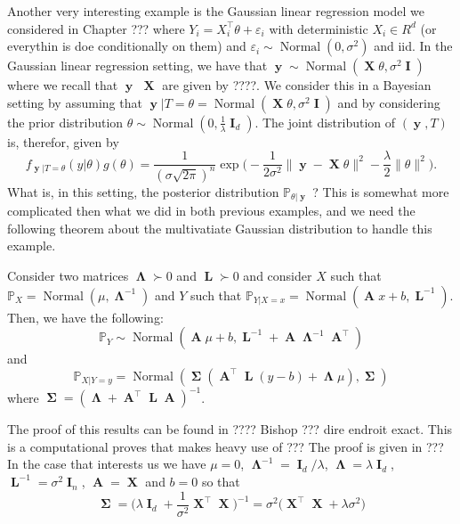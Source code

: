 \documentclass[
	fontsize=11pt, %
	twoside=false, %
	numbers=noenddot, %
]{kaobook}
\DeclareMathOperator{\bA}{{\boldsymbol A}}
\DeclareMathOperator{\bI}{{\boldsymbol I}}
\DeclareMathOperator{\bL}{{\boldsymbol L}}
\DeclareMathOperator{\bX}{{\boldsymbol X}}
\DeclareMathOperator{\by}{{\boldsymbol y}}
\DeclareMathOperator{\bLambda}{{\boldsymbol \Lambda}}
\DeclareMathOperator{\bSigma}{\boldsymbol \Sigma}
\DeclareMathOperator{\nor}{Normal}
\newcommand{\eps}{\varepsilon}
\renewcommand{\P}{\mathbb P}
\newcommand{\norm}[1]{\| #1 \|}
\begin{document}
Another very interesting example is the Gaussian linear regression model we considered in Chapter ??? where
$Y_i = X_i^\top \theta + \eps_i$ with deterministic $X_i \in R^d$ (or everythin is doe conditionally on them) and $\eps_i \sim \nor(0, \sigma^2)$ and iid.
In the Gaussian linear regression setting, we have that $\by \sim \nor(\bX \theta, \sigma^2 \bI)$ where we recall that $\by$ $\bX$ are given by ????.
We consider this in a Bayesian setting by assuming that $\by | T = \theta = \nor(\bX \theta, \sigma^2 \bI)$ and by considering the prior distribution $\theta \sim \nor(0, \frac{1}{\lambda} \bI_d)$.
The joint distribution of $(\by, T)$ is, therefor, given by
\begin{equation*}
	f_{\by | T = \theta}(y | \theta) g(\theta) = \frac{1}{(\sigma \sqrt{2 \pi})^{n}} 
	\exp \Big( -\frac{1}{2 \sigma^2} \norm{\by - \bX \theta}^2 - \frac {\lambda}{2} \norm{\theta}^2 \Big).
\end{equation*}
What is, in this setting, the posterior distribution $\P_{\theta | \by}$ ?
This is somewhat more complicated then what we did in both previous examples, and we need the following theorem about the multivatiate Gaussian distribution to handle this example.
\begin{theorem}
	Consider two matrices $\bLambda \succ 0$ and $\bL \succ 0$ and consider 
	$X$ such that $\P_X = \nor(\mu, \bLambda^{-1})$ and $Y$ such that $\P_{Y | X = x} = \nor(\bA x + b, \bL^{-1})$. Then, we have the following:
	\begin{equation*}
		\P_Y \sim \nor( \bA \mu + b, \bL^{-1} + \bA \bLambda^{-1} \bA^\top)		
	\end{equation*}
	and
	\begin{equation*}
		\P_{X | Y = y} = \nor(\bSigma (\bA^\top \bL (y - b) + \bLambda \mu), \bSigma)
	\end{equation*}
	where $\bSigma = (\bLambda + \bA^\top \bL \bA)^{-1}$.
\end{theorem}
The proof of this results can be found in ???? Bishop ??? dire endroit exact.
This is a computational proves that makes heavy use of ???
 The proof is given in ???
In the case that interests us we have $\mu = 0$, $\bLambda^{-1} = \bI_d / \lambda$, $\bLambda = \lambda \bI_d$, $\bL^{-1} = \sigma^2 \bI_n$, $\bA = \bX$ and $b = 0$ so that
\begin{equation*}
	\bSigma = \Big( \lambda \bI_d + \frac{1}{\sigma^2} \bX^\top \bX \Big)^{-1} = \sigma^2 \Big( \bX^\top \bX  + \lambda \sigma^2 \Big)
\end{equation*}
\end{document}
